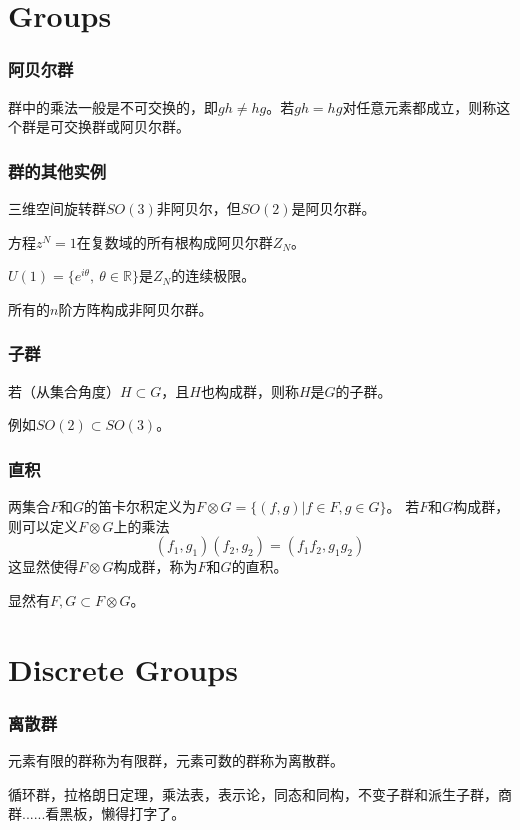 \documentclass[CJK]{beamer}
\newcommand{\reals}{\mathbb{R}}
\begin{document}
\section{Groups}
\begin{frame}
\frametitle{\bch 阿贝尔群 \ech}
\bch
群中的乘法一般是不可交换的，即$gh \not= hg$。若$gh = hg$对任意元素都成立，则称这个群是可交换群或阿贝尔群。

\ech
\end{frame}

\begin{frame}
\frametitle{\bch 群的其他实例 \ech}
\bch
三维空间旋转群$SO(3)$非阿贝尔，但$SO(2)$是阿贝尔群。
\par
方程$z^N = 1$在复数域的所有根构成阿贝尔群$Z_N$。
\par
$U(1) = \{ e^{i \theta},\ \theta \in \reals\}$是$Z_N$的连续极限。
\par
所有的$n$阶方阵构成非阿贝尔群。

\ech
\end{frame}

\begin{frame}
\frametitle{\bch 子群 \ech}
\bch
若（从集合角度）$H\subset G$，且$H$也构成群，则称$H$是$G$的子群。\par
例如$SO(2) \subset SO(3)$。


\ech
\end{frame}

\begin{frame}
\frametitle{\bch 直积 \ech}
\bch
两集合$F$和$G$的笛卡尔积定义为$F\otimes G = \{ (f,g) | f\in F, g \in G\}$。
若$F$和$G$构成群，则可以定义$F\otimes G$上的乘法
$$ (f_1,g_1) (f_2,g_2) = (f_1 f_2,g_1g_2)$$
这显然使得$F\otimes G$构成群，称为$F$和$G$的直积。
\par
显然有$F,G \subset F \otimes G$。


\ech
\end{frame}



\section{Discrete Groups}
\begin{frame}
\frametitle{\bch 离散群 \ech}
\bch
元素有限的群称为有限群，元素可数的群称为离散群。\par
循环群，拉格朗日定理，乘法表，表示论，同态和同构，不变子群和派生子群，商群......看黑板，懒得打字了。


\ech
\end{frame}
\end{document}

